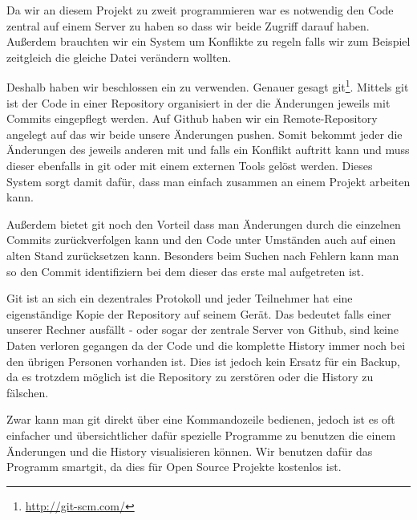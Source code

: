 Da wir an diesem Projekt zu zweit programmieren war es notwendig den Code zentral auf einem Server zu haben so dass wir beide Zugriff darauf haben.
Außerdem brauchten wir ein System um Konflikte zu regeln falls wir zum Beispiel zeitgleich die gleiche Datei verändern wollten.

Deshalb haben wir beschlossen ein  zu verwenden. Genauer gesagt git\footnote{\url{http://git-scm.com/}}. Mittels git ist der Code in einer Repository organisiert in der die Änderungen jeweils mit Commits eingepflegt werden. Auf Github haben wir ein Remote-Repository angelegt auf das wir beide unsere Änderungen pushen. Somit bekommt jeder die Änderungen des jeweils anderen mit und falls ein Konflikt auftritt kann und muss dieser ebenfalls in git oder mit einem externen Tools gelöst werden. Dieses System sorgt damit dafür, dass man einfach zusammen an einem Projekt arbeiten kann.


Außerdem bietet git noch den Vorteil dass man Änderungen durch die einzelnen Commits zurückverfolgen kann und den Code unter Umständen auch auf einen alten Stand zurücksetzen kann. Besonders beim Suchen nach Fehlern kann man so den Commit identifiziern bei dem dieser das erste mal aufgetreten ist. 

Git ist an sich ein dezentrales Protokoll und jeder Teilnehmer hat eine eigenständige Kopie der Repository auf seinem Gerät. Das bedeutet falls einer unserer Rechner ausfällt - oder sogar der zentrale Server von Github, sind keine Daten verloren gegangen da der Code und die komplette History immer noch bei den übrigen Personen vorhanden ist. Dies ist jedoch kein Ersatz für ein Backup, da es trotzdem möglich ist die Repository zu zerstören oder die History zu fälschen.\cite[S 5f]{PGIT}

Zwar kann man git direkt über eine Kommandozeile bedienen, jedoch ist es oft einfacher und übersichtlicher dafür spezielle Programme zu benutzen die einem Änderungen und die History visualisieren können. Wir benutzen dafür das Programm smartgit, da dies für Open Source Projekte kostenlos ist.

